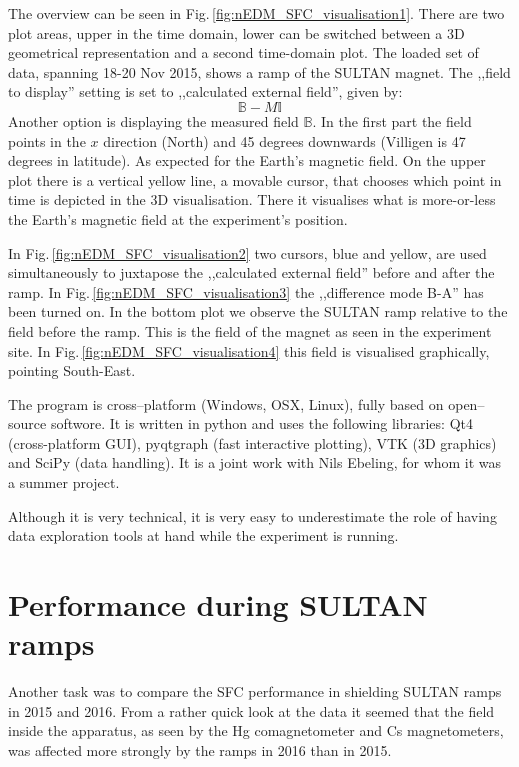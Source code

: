 The overview can be seen in Fig.\,\ref{fig:nEDM_SFC_visualisation1}. There are two plot areas, upper in the time domain, lower can be switched between a 3D geometrical representation and a second time-domain plot. The loaded set of data, spanning 18-20 Nov 2015, shows a ramp of the SULTAN magnet. The ,,field to display'' setting is set to ,,calculated external field'', given by:
\begin{equation}
  \mathbb{B} - M \mathbb{I}
\end{equation}
Another option is displaying the measured field $\mathbb{B}$.
In the first part the field points in the $x$ direction (North) and 45 degrees downwards (Villigen is 47 degrees in latitude). As expected for the Earth's magnetic field. On the upper plot there is a vertical yellow line, a movable cursor, that chooses which point in time is depicted in the 3D visualisation. There it visualises what is more-or-less the Earth's magnetic field at the experiment's position.

In Fig.\,\ref{fig:nEDM_SFC_visualisation2} two cursors, blue and yellow, are used simultaneously to juxtapose the ,,calculated external field'' before and after the ramp. In Fig.\,\ref{fig:nEDM_SFC_visualisation3} the ,,difference mode B-A'' has been turned on. In the bottom plot we observe the SULTAN ramp relative to the field before the ramp. This is the field of the magnet as seen in the experiment site. In Fig.\,\ref{fig:nEDM_SFC_visualisation4} this field is visualised graphically, pointing South-East.


The program is cross--platform (Windows, OSX, Linux), fully based on open--source softwore. It is written in python and uses the following libraries: Qt4 (cross-platform GUI), pyqtgraph (fast interactive plotting), VTK (3D graphics) and SciPy (data handling). It is a joint work with Nils Ebeling, for whom it was a summer project.

Although it is very technical, it is very easy to underestimate the role of having data exploration tools at hand while the experiment is running.



\section{Performance during SULTAN ramps}
Another task was to compare the SFC performance in shielding SULTAN ramps in 2015 and 2016. From a rather quick look at the data it seemed that the field inside the apparatus, as seen by the Hg comagnetometer and Cs magnetometers, was affected more strongly by the ramps in 2016 than in 2015.

